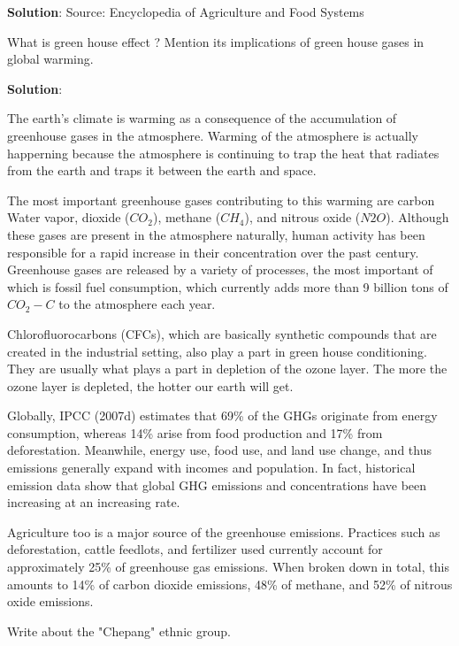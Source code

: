 \documentclass[
  openany]{book}
\newcommand{\question}{\item}
\newenvironment{solution}{ {\bfseries Solution}:}{}
\begin{document}
\begin{questions}
\begin{solution}
Source: Encyclopedia of Agriculture and Food Systems

\end{solution}

\question What is green house effect ? Mention its implications of green house gases in global warming.

\begin{solution}

The earth's climate is warming as a consequence of the accumulation of greenhouse gases in the atmosphere. Warming of the atmosphere is actually happerning because the atmosphere is continuing to trap the heat that radiates from the earth and traps it between the earth and space.

The most important greenhouse gases contributing to this warming are carbon Water vapor, dioxide ($CO_2$), methane ($CH_4$), and nitrous oxide ($N2O$). Although these gases are present in the atmosphere naturally, human activity has been responsible for a rapid increase in their concentration over the past century. Greenhouse gases are released by a variety of processes, the most important of which is fossil fuel consumption, which currently adds more than 9 billion tons of $CO_2-C$ to the atmosphere each year.

Chlorofluorocarbons (CFCs), which are basically synthetic compounds that are created in the industrial setting, also play a part in green house conditioning. They are usually what plays a part in depletion of the ozone layer. The more the ozone layer is depleted, the hotter our earth will get.

Globally, IPCC (2007d) estimates that 69\% of the GHGs originate from energy consumption, whereas 14\% arise from food production and 17\% from deforestation. Meanwhile, energy use, food use, and land use change, and thus emissions generally expand with incomes and population. In fact, historical emission data show that global GHG emissions and concentrations have been increasing at an increasing rate.

Agriculture too is a major source of the greenhouse emissions. Practices such as deforestation, cattle feedlots, and fertilizer used currently account for approximately 25\% of greenhouse gas emissions. When broken down in total, this amounts to 14\% of carbon dioxide emissions, 48\% of methane, and 52\% of nitrous oxide emissions.

\end{solution}

\question Write about the "Chepang" ethnic group.


\end{questions}
\end{document}
